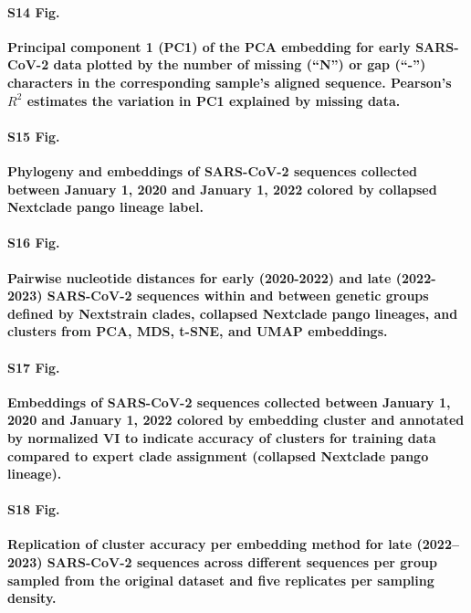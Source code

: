 \documentclass[10pt,letterpaper]{article}
\begin{document}
\paragraph*{S14 Fig.}
\label{S14_Fig_sarscov2_early_pc1_vs_bases_missing}
{\bf Principal component 1 (PC1) of the PCA embedding for early SARS-CoV-2 data plotted by the number of missing (``N'') or gap (``-'') characters in the corresponding sample's aligned sequence. Pearson's $R^{2}$ estimates the variation in PC1 explained by missing data.}

\paragraph*{S15 Fig.}
\label{S15_Fig_sarscov2_early_embeddings_by_Nextclade_pango}
{\bf Phylogeny and embeddings of SARS-CoV-2 sequences collected between January 1, 2020 and January 1, 2022 colored by collapsed Nextclade pango lineage label.}

\paragraph*{S16 Fig.}
\label{S16_Fig_sarscov2_within_between_group_distances}
{\bf Pairwise nucleotide distances for early (2020-2022) and late (2022-2023) SARS-CoV-2 sequences within and between genetic groups defined by Nextstrain clades, collapsed Nextclade pango lineages, and clusters from PCA, MDS, t-SNE, and UMAP embeddings.}

\paragraph*{S17 Fig.}
\label{S17_Fig_sarscov2_early_embeddings_by_cluster_vs_Nextclade_pango}
{\bf Embeddings of SARS-CoV-2 sequences collected between January 1, 2020 and January 1, 2022 colored by embedding cluster and annotated by normalized VI to indicate accuracy of clusters for training data compared to expert clade assignment (collapsed Nextclade pango lineage).}

\paragraph*{S18 Fig.}
\label{S18_Fig_late_sarscov2_replication_of_cluster_accuracy}
{\bf Replication of cluster accuracy per embedding method for late (2022--2023) SARS-CoV-2 sequences across different sequences per group sampled from the original dataset and five replicates per sampling density.}
\end{document}
